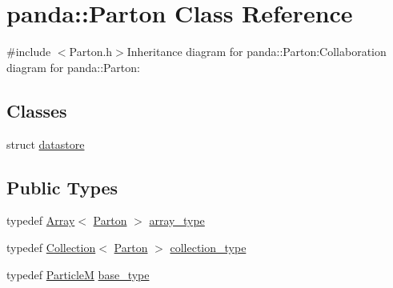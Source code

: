\hypertarget{classpanda_1_1Parton}{
\section{panda::Parton Class Reference}
\label{classpanda_1_1Parton}
}


{\ttfamily \#include $<$Parton.h$>$}Inheritance diagram for panda::Parton:Collaboration diagram for panda::Parton:\subsection*{Classes}
\begin{DoxyCompactItemize}
\item 
struct \hyperlink{structpanda_1_1Parton_1_1datastore}{datastore}
\end{DoxyCompactItemize}
\subsection*{Public Types}
\begin{DoxyCompactItemize}
\item 
typedef \hyperlink{classpanda_1_1Array}{Array}$<$ \hyperlink{classpanda_1_1Parton}{Parton} $>$ \hyperlink{classpanda_1_1Parton_a779a461ff7aa46eda35c663576532b02}{array\_\-type}
\item 
typedef \hyperlink{classpanda_1_1Collection}{Collection}$<$ \hyperlink{classpanda_1_1Parton}{Parton} $>$ \hyperlink{classpanda_1_1Parton_adced932b94de43884831c4685e542518}{collection\_\-type}
\item 
typedef \hyperlink{classpanda_1_1ParticleM}{ParticleM} \hyperlink{classpanda_1_1Parton_a4a5dd86c3661af38dced3271214551c4}{base\_\-type}
\end{DoxyCompactItemize}
